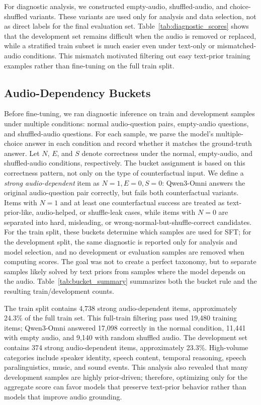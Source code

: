 \documentclass{article}
\begin{document}
For diagnostic analysis, we constructed empty-audio, shuffled-audio, and choice-shuffled variants.
These variants are used only for analysis and data selection, not as direct labels for the final evaluation set.
Table~\ref{tab:diagnostic_scores} shows that the development set remains difficult when the audio is removed or replaced, while a stratified train subset is much easier even under text-only or mismatched-audio conditions.
This mismatch motivated filtering out easy text-prior training examples rather than fine-tuning on the full train split.



\subsection{Audio-Dependency Buckets}
\label{sec:diagnostics}
Before fine-tuning, we ran diagnostic inference on train and development samples under multiple conditions: normal audio-question pairs, empty-audio questions, and shuffled-audio questions.
For each sample, we parse the model's multiple-choice answer in each condition and record whether it matches the ground-truth answer.
Let $N$, $E$, and $S$ denote correctness under the normal, empty-audio, and shuffled-audio conditions, respectively.
The bucket assignment is based on this correctness pattern, not only on the type of counterfactual input.
We define a \emph{strong audio-dependent} item as $N{=}1,E{=}0,S{=}0$: Qwen3-Omni answers the original audio-question pair correctly, but fails both counterfactual variants.
Items with $N{=}1$ and at least one counterfactual success are treated as text-prior-like, audio-helped, or shuffle-leak cases, while items with $N{=}0$ are separated into hard, misleading, or wrong-normal-but-shuffle-correct candidates.
For the train split, these buckets determine which samples are used for SFT; for the development split, the same diagnostic is reported only for analysis and model selection, and no development or evaluation samples are removed when computing scores.
The goal was not to create a perfect taxonomy, but to separate samples likely solved by text priors from samples where the model depends on the audio.
Table~\ref{tab:bucket_summary} summarizes both the bucket rule and the resulting train/development counts.



The train split contains 4,738 strong audio-dependent items, approximately 24.3\% of the full train set.
This full-train filtering pass used 19,480 training items; Qwen3-Omni answered 17,098 correctly in the normal condition, 11,441 with empty audio, and 9,140 with random shuffled audio.
The development set contains 374 strong audio-dependent items, approximately 23.3\%.
High-volume categories include speaker identity, speech content, temporal reasoning, speech paralinguistics, music, and sound events.
This analysis also revealed that many development samples are highly prior-driven; therefore, optimizing only for the aggregate score can favor models that preserve text-prior behavior rather than models that improve audio grounding.
\end{document}
